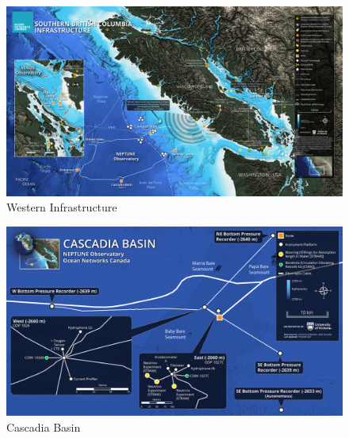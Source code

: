 \begin{figure}[h]
  \centering
  \includegraphics[width=.9\textwidth]{./Figures/western_infrastructure.png}
  \caption{Western Infrastructure}
  \label{west_inf}
\end{figure}


\begin{figure}
  \centering
  \includegraphics[width=.9\textwidth]{./Figures/cascadia_basin.png}
  \caption{Cascadia Basin}
  \label{fig:casc}
\end{figure}



